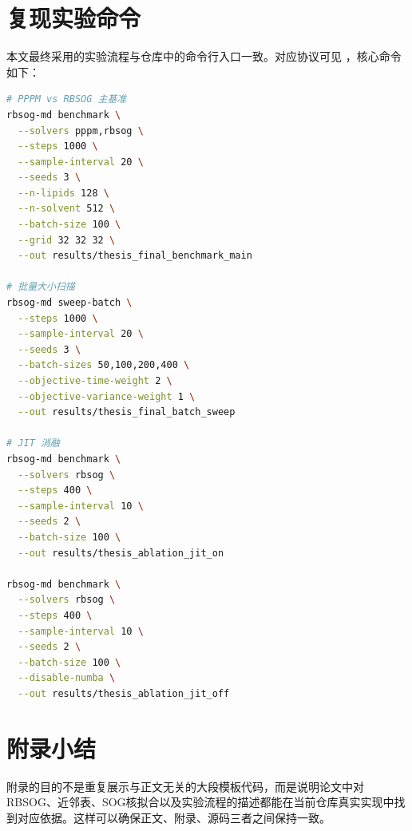 \section{复现实验命令}

本文最终采用的实验流程与仓库中的命令行入口一致。对应协议可见 ，核心命令如下：

\begin{lstlisting}[language=bash, caption=论文核心实验命令]
# PPPM vs RBSOG 主基准
rbsog-md benchmark \
  --solvers pppm,rbsog \
  --steps 1000 \
  --sample-interval 20 \
  --seeds 3 \
  --n-lipids 128 \
  --n-solvent 512 \
  --batch-size 100 \
  --grid 32 32 32 \
  --out results/thesis_final_benchmark_main

# 批量大小扫描
rbsog-md sweep-batch \
  --steps 1000 \
  --sample-interval 20 \
  --seeds 3 \
  --batch-sizes 50,100,200,400 \
  --objective-time-weight 2 \
  --objective-variance-weight 1 \
  --out results/thesis_final_batch_sweep

# JIT 消融
rbsog-md benchmark \
  --solvers rbsog \
  --steps 400 \
  --sample-interval 10 \
  --seeds 2 \
  --batch-size 100 \
  --out results/thesis_ablation_jit_on

rbsog-md benchmark \
  --solvers rbsog \
  --steps 400 \
  --sample-interval 10 \
  --seeds 2 \
  --batch-size 100 \
  --disable-numba \
  --out results/thesis_ablation_jit_off
\end{lstlisting}

\section{附录小结}

附录的目的不是重复展示与正文无关的大段模板代码，而是说明论文中对RBSOG、近邻表、SOG核拟合以及实验流程的描述都能在当前仓库真实实现中找到对应依据。这样可以确保正文、附录、源码三者之间保持一致。
